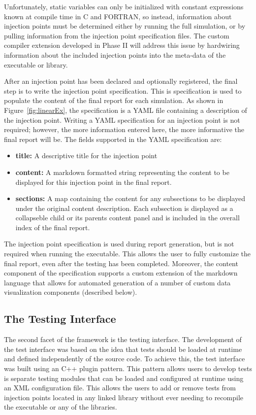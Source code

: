 Unfortunately, static variables can only be initialized with constant expressions known at compile time in C and FORTRAN, so instead, information about injection points must be determined either by running the full simulation, or by pulling information from the injection point specification files. The custom compiler extension developed in Phase II will address this issue by hardwiring information about the included injection points into the meta-data of the executable or library. 

After an injection point has been declared and optionally registered, the final step is to write the injection point specification. This is specification is used to populate the content of the final \VV report for each simulation. As shown in Figure~\ref{fig:linearEx}, the specification is a YAML file containing a description of the injection point. Writing a YAML specification 
for an injection point is not required; however, the more information entered here, the more informative the final report will be. The fields supported in the YAML specification are:

\begin{itemize}
 \item {\bf title:} A descriptive title for the injection point 
 \item {\bf content:} A markdown formatted string representing the content to be displayed for this injection point in the final report.
 \item {\bf sections:} A map containing the content for any subsections to be displayed under the original content description. Each subsection is displayed  as a collapseble child or its parents content panel and is included in the overall index of the final report. 
 \end{itemize}

The injection point specification is used during report generation, but is not required when running the executable. This
allows the user to fully customize the final report, even after the \VV testing has been completed. Moreover, the content
component of the specification supports a custom extension of the markdown language that allows for automated generation
of a number of custom data visualization components (described below). 

\subsection{The Testing Interface} 

The second facet of the framework is the \VV testing interface. The development of the 
test interface was based on the idea that tests should be loaded at runtime and defined independently of the source code. To achieve this, the test
interface was built using an C++ plugin pattern. This pattern allows users to develop tests is separate testing modules that can be loaded and configured 
at runtime using an XML configuration file. This allows the users to add or remove tests from injection points located in any linked library without ever 
needing to recompile the executable or any of the libraries. 

